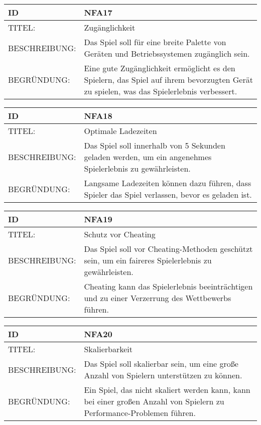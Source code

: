 \documentclass{uulm-assignment}
\begin{document}
    \begin{tabularx}{\textwidth}{|l|X |} \hline
        \textbf{ID} & \textbf{NFA17} \\
        \hline
        TITEL: & Zugänglichkeit \\
        \hline
        BESCHREIBUNG: &   Das Spiel soll für eine breite Palette von Geräten und Betriebssystemen zugänglich sein.  \\
        \hline
        BEGRÜNDUNG: & Eine gute Zugänglichkeit ermöglicht es den Spielern, das Spiel auf ihrem bevorzugten Gerät zu spielen, was das Spielerlebnis verbessert. \\
        \hline
    \end{tabularx}
    
    \begin{tabularx}{\textwidth}{|l|X |} \hline
        \textbf{ID} & \textbf{NFA18} \\
        \hline
        TITEL: &  Optimale Ladezeiten \\
        \hline
        BESCHREIBUNG: &   Das Spiel soll innerhalb von 5 Sekunden geladen werden, um ein angenehmes Spielerlebnis zu gewährleisten. \\
        \hline
        BEGRÜNDUNG: & Langsame Ladezeiten können dazu führen, dass Spieler das Spiel verlassen, bevor es geladen ist. \\
        \hline
    \end{tabularx}
    
    \begin{tabularx}{\textwidth}{|l|X |} \hline
        \textbf{ID} & \textbf{NFA19} \\
        \hline
        TITEL: & Schutz vor Cheating \\
        \hline
        BESCHREIBUNG: &  Das Spiel soll vor Cheating-Methoden geschützt sein, um ein faireres Spielerlebnis zu gewährleisten. \\
        \hline
        BEGRÜNDUNG: & Cheating kann das Spielerlebnis beeinträchtigen und zu einer Verzerrung des Wettbewerbs führen. \\
        \hline
    \end{tabularx}
    
    \begin{tabularx}{\textwidth}{|l|X |} \hline
        \textbf{ID} & \textbf{NFA20} \\
        \hline
        TITEL: & Skalierbarkeit \\
        \hline
        BESCHREIBUNG: & Das Spiel soll skalierbar sein, um eine große Anzahl von Spielern unterstützen zu können. \\
        \hline
        BEGRÜNDUNG: & Ein Spiel, das nicht skaliert werden kann, kann bei einer großen Anzahl von Spielern zu Performance-Problemen führen. \\
        \hline
    \end{tabularx}
    
\end{document}
